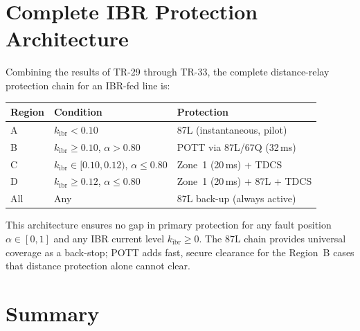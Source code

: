 \documentclass[11pt,a4paper]{article}
\begin{document}
\section{Complete IBR Protection Architecture}
\label{sec:architecture}

Combining the results of TR-29 through TR-33, the complete distance-relay
protection chain for an IBR-fed line is:

\begin{center}
\begin{tabular}{@{}lll@{}}
\toprule
Region & Condition & Protection\\
\midrule
A & $k_\mathrm{ibr}<0.10$ & 87L (instantaneous, pilot)\\
B & $k_\mathrm{ibr}\geq0.10$, $\alpha>0.80$ & POTT via 87L/67Q (32\,ms)\\
C & $k_\mathrm{ibr}\in[0.10,0.12)$, $\alpha\leq0.80$ & Zone~1 (20\,ms) + TDCS\\
D & $k_\mathrm{ibr}\geq0.12$, $\alpha\leq0.80$ & Zone~1 (20\,ms) + 87L + TDCS\\
All & Any & 87L back-up (always active)\\
\bottomrule
\end{tabular}
\end{center}

\medskip\noindent
This architecture ensures no gap in primary protection for any fault position
$\alpha\in[0,1]$ and any IBR current level $k_\mathrm{ibr}\geq0$.  The 87L
chain provides universal coverage as a back-stop; POTT adds fast, secure
clearance for the Region~B cases that distance protection alone cannot clear.

\section{Summary}
\label{sec:summary}
\end{document}
